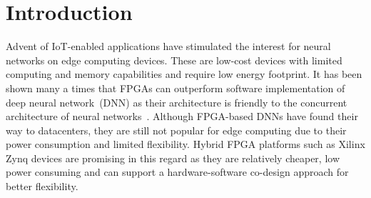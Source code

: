 \section{Introduction}
\label{sec:intro}

Advent of IoT-enabled applications have stimulated the interest for neural networks on edge computing devices.
These are low-cost devices with limited computing and memory capabilities and require low energy footprint.
It has been shown many a times that FPGAs can outperform software implementation of deep neural network~(DNN) as their architecture is friendly to the concurrent architecture of neural networks~\cite{Huimin2016}.
Although FPGA-based DNNs have found their way to datacenters, they are still not popular for edge computing due to their power consumption and limited flexibility.
Hybrid FPGA platforms such as Xilinx Zynq devices are promising in this regard as they are relatively cheaper, low power consuming and can support a hardware-software co-design approach for better flexibility.